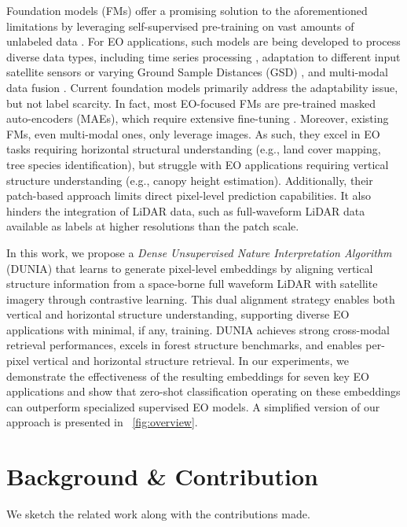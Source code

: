 Foundation models (FMs) offer a promising solution to the aforementioned limitations by leveraging self-supervised pre-training on vast amounts of unlabeled data \cite{Brown_etal_2020,Devlin_2018,Kirillov_etal_2023,Minderer_etal_2022,Radford_etal_2021}. For EO applications, such models are being developed to process diverse data types, including time series processing \cite{Yuan_etal_2022}, adaptation to different input satellite sensors \cite{Xiong_etal_2024} or varying Ground Sample Distances (GSD) \cite{Reed_etal_2023}, and multi-modal data fusion \cite{Astruc_etal_2025, astruc2024anysat, Fuller_etal_2024}.
Current foundation models primarily address the adaptability issue, but not label scarcity. In fact, most EO-focused FMs are pre-trained masked auto-encoders (MAEs), which require extensive fine-tuning \cite{Lehner_etal_2024,Singh_etal_2023}. Moreover, existing FMs, even multi-modal ones, only leverage images. 
As such, they excel in EO tasks requiring horizontal structural understanding (e.g., land cover mapping, tree species identification), but struggle with EO applications requiring vertical structure understanding (e.g., canopy height estimation).
Additionally, their patch-based approach limits direct pixel-level prediction capabilities. It also hinders the integration of LiDAR data, such as full-waveform LiDAR data available as labels at higher resolutions than the patch scale. 

In this work, we propose a \emph{Dense Unsupervised Nature Interpretation Algorithm} (DUNIA) that learns to generate pixel-level embeddings by aligning vertical structure information from a space-borne full waveform LiDAR with satellite imagery through contrastive learning. This dual alignment strategy enables both vertical and horizontal structure understanding, supporting diverse EO applications with minimal, if any, training. DUNIA achieves strong cross-modal retrieval performances, excels in forest structure benchmarks, and enables per-pixel vertical and horizontal structure retrieval. In our experiments, we demonstrate the effectiveness of the resulting embeddings for seven key EO applications and show that zero-shot classification operating on these embeddings can outperform specialized supervised EO models. A simplified version of our approach is presented in ~\cref{fig:overview}.

\section{Background \& Contribution}
We sketch the related work along with the contributions made. 

